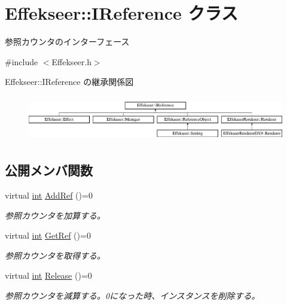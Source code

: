 \hypertarget{class_effekseer_1_1_i_reference}{}\section{Effekseer\+:\+:I\+Reference クラス}
\label{class_effekseer_1_1_i_reference}


参照カウンタのインターフェース  




{\ttfamily \#include $<$Effekseer.\+h$>$}

Effekseer\+:\+:I\+Reference の継承関係図\begin{figure}[H]
\begin{center}
\leavevmode
\includegraphics[height=1.990521cm]{class_effekseer_1_1_i_reference}
\end{center}
\end{figure}
\subsection*{公開メンバ関数}
\begin{DoxyCompactItemize}
\item 
virtual \mbox{\hyperlink{namespace_effekseer_ace0abf7c2e6947e519ebe8b54cbcc30a}{int}} \mbox{\hyperlink{class_effekseer_1_1_i_reference_a3e3b54e8e5081e24f5784e4f9b8f6257}{Add\+Ref}} ()=0
\begin{DoxyCompactList}\small\item\em 参照カウンタを加算する。 \end{DoxyCompactList}\item 
virtual \mbox{\hyperlink{namespace_effekseer_ace0abf7c2e6947e519ebe8b54cbcc30a}{int}} \mbox{\hyperlink{class_effekseer_1_1_i_reference_a95274c788c8c03d27a3e424facc728b6}{Get\+Ref}} ()=0
\begin{DoxyCompactList}\small\item\em 参照カウンタを取得する。 \end{DoxyCompactList}\item 
virtual \mbox{\hyperlink{namespace_effekseer_ace0abf7c2e6947e519ebe8b54cbcc30a}{int}} \mbox{\hyperlink{class_effekseer_1_1_i_reference_ad8d601188c0f088f4748aa2da8758bb5}{Release}} ()=0
\begin{DoxyCompactList}\small\item\em 参照カウンタを減算する。0になった時、インスタンスを削除する。 \end{DoxyCompactList}\end{DoxyCompactItemize}


